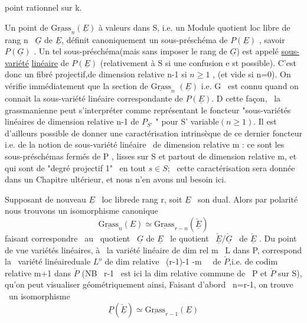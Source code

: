 
point rationnel sur k.

Un point de $\underline{\mathrm{Grass}}_n(\underline{E})$ à valeurs dans S, i.e. un Module quotient
loc libre de rang n \ $\underline{G}$ de $\underline{E}$, définit canoniquement un sous-préschéma
de $P(\underline{E})$ , savoir $P(\underline{G})$ . Un tel sous-préschéma(mais sans imposer le rang de $\underline{G}$) est appelé \uline{sous-variété}
\uline{linéaire} de $P(\underline{E})$ (relativement à S si une confusion e st possible).
C'est donc un fibré projectif,de dimension relative n-1 si $n\geqslant 1$ ,
(et vide si n=0). On vérifie immédiatement que la section de $\underline{\mathrm{Grass}}_n$
$(\underline{E})$ i.e. G \ est connu quand on connait la sous-variété linéaire
correspondante de $P(\underline{E})$. D cette façon, \ la grassmanienne peut
s'interpréter comme représentant le foncteur "sous-variétés linéaires
de dimension relative n-1  de $P_{S'}$ " pour S'
variable$(n\geqslant 1)$. Il est d'ailleurs possible de donner une caractérisation
intrinsèque de ce dernier foncteur i.e. de la notion de sous-variété
linéaire \ de dimension relative m : ce sont les sous-préschémas fermés
de P , lisses sur S et partout de dimension relative m, et qui sont
de "degré projectif 1" \ en tout $s\in S$; \ cette caractérisation sera
donnée dans un Chapitre ultérieur, et nous n'en avons nul besoin ici.

Supposant de nouveau $\underline{E}$ \ loc librede rang r, soit $\underline{E}$ \ son dual. Alors
par polarité nous trouvons un isomorphisme canonique
\[ \underline{\mathrm{Grass}}_n(E) \simeq \underline{\mathrm{Grass}}_{r-n}(\check{\underline{E}}) \]
faisant correspondre \ au \ quotient \ $\underline{G}$ de $\underline{E}$ \ le quotient \ $\check{\underline{E}}/\check{\underline{G}}$ \ de $\check{\underline{E}}$ .
Du point de vue variétés linéaires, à \ la variété linéaire de dim rel
m \ L dans P, correspond la \ variété linéaireduale $L^{o}$ de dim relative
 \ (r-1)-1 -m \ \ de $\check{P}$,i.e. de codim relative m+1 dans $\check{P}$ (NB \ r-1 \ est ici la dim relative
commune de \ P et $\check{P}$ sur S), qu'on peut visualiser géométriquement ainsi,
Faisant d'abord \ n=r-1, on trouve \ un isomorphisme
\[ \underline{P}(\check{\underline{E}}) \simeq \underline{\mathrm{Grass}}_{r-1}(\underline{E}) \]

